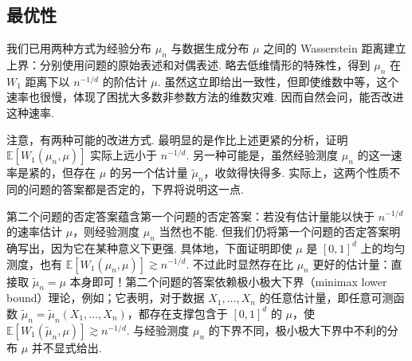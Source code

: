 \subsection{最优性}\label{sec:2.6}
我们已用两种方式为经验分布 $\mu_n$ 与数据生成分布 $\mu$ 之间的 Wasserstein 距离建立上界：分别使用问题的原始表述和对偶表述. 略去低维情形的特殊性，得到 $\mu_n$ 在 $W_1$ 距离下以 $n^{-1/d}$ 的阶估计 $\mu$. 虽然这立即给出一致性，但即使维数中等，这个速率也很慢，体现了困扰大多数非参数方法的维数灾难. 因而自然会问，能否改进这种速率.

注意，有两种可能的改进方式. 最明显的是作比上述更紧的分析，证明 $\mathbb E[W_1(\mu_n,\mu)]$ 实际上远小于 $n^{-1/d}$. 另一种可能是，虽然经验测度 $\mu_n$ 的这一速率是紧的，但存在 $\mu$ 的另一个估计量 $\tilde\mu_n$，收敛得快得多. 实际上，这两个性质不同的问题的答案都是否定的，下界将说明这一点.

第二个问题的否定答案蕴含第一个问题的否定答案：若没有估计量能以快于 $n^{-1/d}$ 的速率估计 $\mu$，则经验测度 $\mu_n$ 当然也不能. 但我们仍将第一个问题的否定答案明确写出，因为它在某种意义下更强. 具体地，下面证明即使 $\mu$ 是 $[0,1]^d$ 上的均匀测度，也有 $\mathbb E[W_1(\mu_n,\mu)]\gtrsim n^{-1/d}$. 不过此时显然存在比 $\mu_n$ 更好的估计量：直接取 $\tilde\mu_n=\mu$ 本身即可！第二个问题的答案依赖极小极大下界（minimax lower bound）理论，例如\cite[第2章]{ref302}；它表明，对于数据 $X_1,\ldots,X_n$ 的任意估计量，即任意可测函数 $\tilde\mu_n=\tilde\mu_n(X_1,\ldots,X_n)$，都存在支撑包含于 $[0,1]^d$ 的 $\mu$，使 $\mathbb E[W_1(\tilde\mu_n,\mu)]\gtrsim n^{-1/d}$. 与经验测度 $\mu_n$ 的下界不同，极小极大下界中不利的分布 $\mu$ 并不显式给出.

